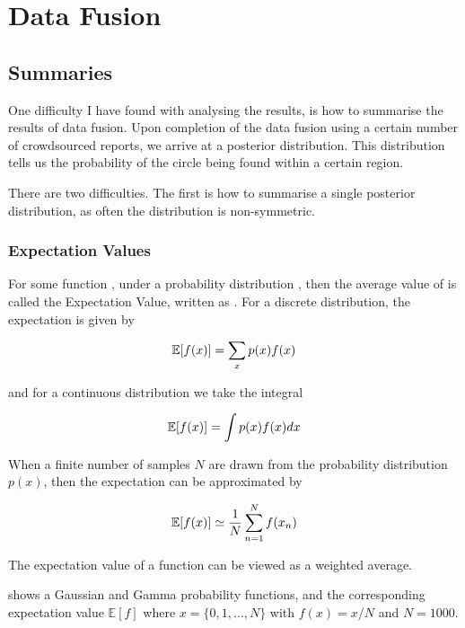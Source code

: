\chapter{Data Fusion} \label{Chapter: DataFusion}

\section{Summaries}

One difficulty I have found with analysing the results, is how to summarise the results of data fusion. 
Upon completion of the data fusion using a certain number of crowdsourced reports, we arrive at a posterior distribution. 
This distribution tells us the probability of the circle being found within a certain region. 

There are two difficulties. 
The first is how to summarise a single posterior distribution, as often the distribution is non-symmetric. 

\subsection{Expectation Values}

For some function \funcx, under a probability distribution \probx, then the average value of \funcx is called the Expectation Value, written as \expectation{\funcx}. 
For a discrete distribution, the expectation is given by

\begin{equation}\label{Equation: discrete_expectation}
\mathbb{E}[f(x)]=\sum\limits_x p(x)f(x)
\end{equation}

and for a continuous distribution we take the integral

\begin{equation}\label{•}
\mathbb{E}[f(x)]=\int p(x)f(x) dx
\end{equation}

When a finite number of samples $N$ are drawn from the probability distribution $p(x)$, then the expectation can be approximated by 

\begin{equation}\label{Equation: discrete_sample_expectation}
\mathbb{E}[f(x)]\simeq\frac{1}{N}\sum\limits_{n=1}^N f(x_n)
\end{equation}

The expectation value of a function can be viewed as a weighted average.

 shows a Gaussian and Gamma probability functions, and the corresponding expectation value $\mathbb{E}[f]$ where $x=\lbrace0,1,...,N\rbrace$ with $f(x)=x/N$ and $N=1000$. 

